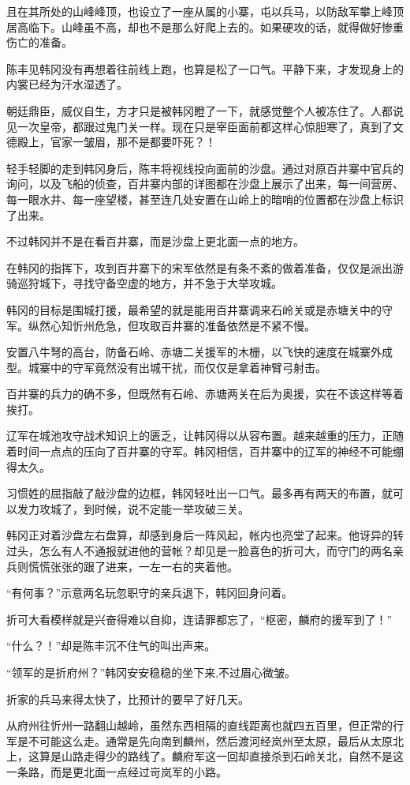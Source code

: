 且在其所处的山峰峰顶，也设立了一座从属的小寨，屯以兵马，以防敌军攀上峰顶居高临下。山峰虽不高，却也不是那么好爬上去的。如果硬攻的话，就得做好惨重伤亡的准备。

陈丰见韩冈没有再想着往前线上跑，也算是松了一口气。平静下来，才发现身上的内裳已经为汗水湿透了。

朝廷鼎臣，威仪自生，方才只是被韩冈瞪了一下，就感觉整个人被冻住了。人都说见一次皇帝，都跟过鬼门关一样。现在只是宰臣面前都这样心惊胆寒了，真到了文德殿上，官家一皱眉，那不是都要吓死？！

轻手轻脚的走到韩冈身后，陈丰将视线投向面前的沙盘。通过对原百井寨中官兵的询问，以及飞船的侦查，百井寨内部的详图都在沙盘上展示了出来，每一间营房、每一眼水井、每一座望楼，甚至连几处安置在山岭上的暗哨的位置都在沙盘上标识了出来。

不过韩冈并不是在看百井寨，而是沙盘上更北面一点的地方。

在韩冈的指挥下，攻到百井寨下的宋军依然是有条不紊的做着准备，仅仅是派出游骑巡狩城下，寻找守备空虚的地方，并不急于大举攻城。

韩冈的目标是围城打援，最希望的就是能用百井寨调来石岭关或是赤塘关中的守军。纵然心知忻州危急，但攻取百井寨的准备依然是不紧不慢。

安置八牛弩的高台，防备石岭、赤塘二关援军的木栅，以飞快的速度在城寨外成型。城寨中的守军竟然没有出城干扰，而仅仅是拿着神臂弓射击。

百井寨的兵力的确不多，但既然有石岭、赤塘两关在后为奥援，实在不该这样等着挨打。

辽军在城池攻守战术知识上的匮乏，让韩冈得以从容布置。越来越重的压力，正随着时间一点点的压向了百井寨的守军。韩冈相信，百井寨中的辽军的神经不可能绷得太久。

习惯姓的屈指敲了敲沙盘的边框，韩冈轻吐出一口气。最多再有两天的布置，就可以发力攻城了，到时候，说不定能一举攻破三关。

韩冈正对着沙盘左右盘算，却感到身后一阵风起，帐内也亮堂了起来。他讶异的转过头，怎么有人不通报就进他的营帐？却见是一脸喜色的折可大，而守门的两名亲兵则慌慌张张的跟了进来，一左一右的夹着他。

“有何事？”示意两名玩忽职守的亲兵退下，韩冈回身问着。

折可大看模样就是兴奋得难以自抑，连请罪都忘了，“枢密，麟府的援军到了！”

“什么？！”却是陈丰沉不住气的叫出声来。

“领军的是折府州？”韩冈安安稳稳的坐下来,不过眉心微皱。

折家的兵马来得太快了，比预计的要早了好几天。

从府州往忻州一路翻山越岭，虽然东西相隔的直线距离也就四五百里，但正常的行军是不可能这么走。通常是先向南到麟州，然后渡河经岚州至太原，最后从太原北上，这算是山路走得少的路线了。麟府军这一回却直接杀到石岭关北，自然不是这一条路，而是更北面一点经过岢岚军的小路。


